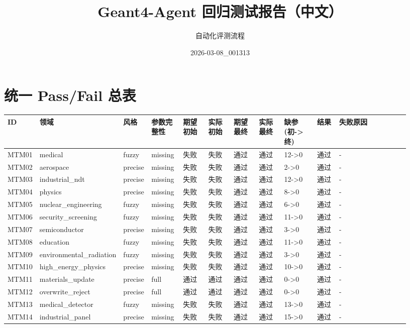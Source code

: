 \documentclass[11pt]{ctexart}
\title{Geant4-Agent 回归测试报告（中文）}
\author{自动化评测流程}
\date{2026-03-08\_001313}
\begin{document}
\maketitle
\section{统一 Pass/Fail 总表}
\begin{longtable}{p{0.06\linewidth}p{0.08\linewidth}p{0.07\linewidth}p{0.08\linewidth}p{0.07\linewidth}p{0.07\linewidth}p{0.07\linewidth}p{0.07\linewidth}p{0.09\linewidth}p{0.06\linewidth}p{0.21\linewidth}}
\toprule
ID & 领域 & 风格 & 参数完整性 & 期望初始 & 实际初始 & 期望最终 & 实际最终 & 缺参(初->终) & 结果 & 失败原因 \\
\midrule
MTM01 & medical & fuzzy & missing & 失败 & 失败 & 通过 & 通过 & 12->0 & 通过 & - \\
MTM02 & aerospace & precise & missing & 失败 & 失败 & 通过 & 通过 & 2->0 & 通过 & - \\
MTM03 & industrial\_ndt & precise & missing & 失败 & 失败 & 通过 & 通过 & 12->0 & 通过 & - \\
MTM04 & physics & precise & missing & 失败 & 失败 & 通过 & 通过 & 8->0 & 通过 & - \\
MTM05 & nuclear\_engineering & fuzzy & missing & 失败 & 失败 & 通过 & 通过 & 6->0 & 通过 & - \\
MTM06 & security\_screening & fuzzy & missing & 失败 & 失败 & 通过 & 通过 & 11->0 & 通过 & - \\
MTM07 & semiconductor & precise & missing & 失败 & 失败 & 通过 & 通过 & 3->0 & 通过 & - \\
MTM08 & education & fuzzy & missing & 失败 & 失败 & 通过 & 通过 & 11->0 & 通过 & - \\
MTM09 & environmental\_radiation & fuzzy & missing & 失败 & 失败 & 通过 & 通过 & 3->0 & 通过 & - \\
MTM10 & high\_energy\_physics & precise & missing & 失败 & 失败 & 通过 & 通过 & 10->0 & 通过 & - \\
MTM11 & materials\_update & precise & full & 通过 & 通过 & 通过 & 通过 & 0->0 & 通过 & - \\
MTM12 & overwrite\_reject & precise & full & 通过 & 通过 & 通过 & 通过 & 0->0 & 通过 & - \\
MTM13 & medical\_detector & fuzzy & missing & 失败 & 失败 & 通过 & 通过 & 13->0 & 通过 & - \\
MTM14 & industrial\_panel & precise & missing & 失败 & 失败 & 通过 & 通过 & 15->0 & 通过 & - \\

\end{longtable}
\end{document}
